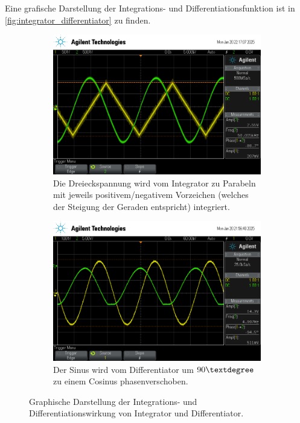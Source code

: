 Eine grafische Darstellung der Integrations- und Differentiationsfunktion ist in \autoref{fig:integrator_differentiator} zu finden.
\begin{figure}
    \centering
    \begin{subfigure}{\textwidth}
        \centering
        \includegraphics[width=0.7\linewidth]{data/scope_7.png}
        \caption{Die Dreieckspannung wird vom Integrator zu Parabeln mit jeweils positivem/negativem Vorzeichen (welches der Steigung der Geraden entspricht) integriert.}
        \label{fig:generator_gedampft}
    \end{subfigure}
    \begin{subfigure}{\textwidth}
        \centering
        \includegraphics[width=0.7\linewidth]{data/scope_2.png}
        \caption{Der Sinus wird vom Differentiator um $90\textdegree$ zu einem Cosinus phasenverschoben.}
        \label{fig:generator_gedampft_plot}
    \end{subfigure}
    \caption{Graphische Darstellung der Integrations- und Differentiationswirkung von Integrator und Differentiator.}
    \label{fig:integrator_differentiator}
\end{figure}


